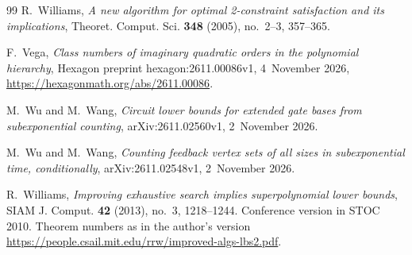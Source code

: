 \documentclass[10pt]{amsart}
\theoremstyle{plain}
\theoremstyle{definition}
\theoremstyle{remark}
\numberwithin{equation}{section}
\begin{document}
\begin{thebibliography}{99}
R.~Williams, \emph{A new algorithm for optimal 2-constraint satisfaction and its implications},
Theoret. Comput. Sci. \textbf{348} (2005), no.~2--3, 357--365.

F.~Vega, \emph{Class numbers of imaginary quadratic orders in the polynomial hierarchy}, Hexagon
preprint hexagon:2611.00086v1, 4~November 2026, \url{https://hexagonmath.org/abs/2611.00086}.

M.~Wu and M.~Wang, \emph{Circuit lower bounds for extended gate bases from subexponential counting},
arXiv:2611.02560v1, 2~November 2026.

M.~Wu and M.~Wang, \emph{Counting feedback vertex sets of all sizes in subexponential time,
conditionally}, arXiv:2611.02548v1, 2~November 2026.

R.~Williams, \emph{Improving exhaustive search implies superpolynomial lower bounds}, SIAM J.
Comput. \textbf{42} (2013), no.~3, 1218--1244. Conference version in STOC 2010. Theorem numbers as
in the author's version \url{https://people.csail.mit.edu/rrw/improved-algs-lbs2.pdf}.

\end{thebibliography}
\end{document}
